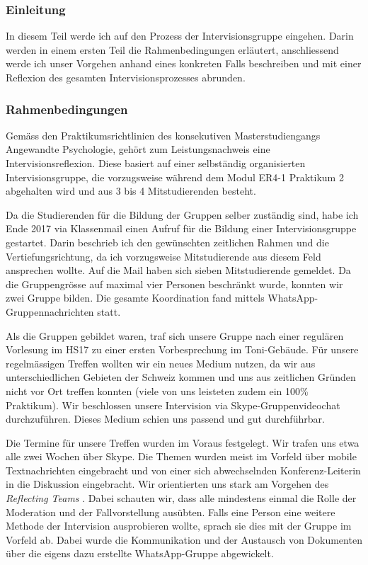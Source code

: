 \subsubsection{Einleitung}
In diesem Teil werde ich auf den Prozess der Intervisionsgruppe  eingehen. Darin werden in einem ersten Teil die Rahmenbedingungen erläutert, anschliessend werde ich unser Vorgehen anhand eines konkreten Falls beschreiben und mit einer Reflexion des gesamten Intervisionsprozesses abrunden. 

\subsubsection{Rahmenbedingungen}
Gemäss den Praktikumsrichtlinien des konsekutiven Masterstudiengangs Angewandte Psychologie, gehört zum Leistungsnachweis eine Intervisionsreflexion. Diese basiert auf einer selbständig organisierten Intervisionsgruppe, die vorzugsweise während dem Modul ER4-1 Praktikum 2 abgehalten wird und aus 3 bis 4 Mitstudierenden besteht.

Da die Studierenden für die Bildung der Gruppen selber zuständig sind, habe ich Ende 2017 via Klassenmail einen Aufruf für die Bildung einer Intervisionsgruppe gestartet. Darin beschrieb ich den gewünschten zeitlichen Rahmen und die Vertiefungsrichtung, da ich vorzugsweise Mitstudierende aus diesem Feld ansprechen wollte. Auf die Mail haben sich sieben Mitstudierende gemeldet. Da die Gruppengrösse auf maximal vier Personen beschränkt wurde, konnten wir zwei Gruppe bilden. Die gesamte Koordination fand 
mittels WhatsApp-Gruppennachrichten statt.

Als die Gruppen gebildet waren, traf sich unsere Gruppe nach einer regulären Vorlesung im HS17 zu einer ersten Vorbesprechung im Toni-Gebäude. Für unsere regelmässigen Treffen wollten wir ein neues Medium nutzen, da wir aus unterschiedlichen Gebieten der Schweiz kommen und uns aus zeitlichen Gründen nicht vor Ort treffen konnten (viele von uns leisteten zudem ein 100\% Praktikum). Wir beschlossen unsere Intervision via Skype-Gruppenvideochat durchzuführen. Dieses Medium schien uns passend und gut durchführbar. 

Die Termine für unsere Treffen wurden im Voraus festgelegt. Wir trafen uns etwa alle zwei Wochen über Skype. Die Themen wurden meist im Vorfeld über mobile Textnachrichten eingebracht und von einer sich abwechselnden Konferenz-Leiterin in die Diskussion eingebracht. Wir orientierten uns stark am Vorgehen des \textit{Reflecting Teams} \cite{ReflectingTeam2018}. Dabei schauten wir, dass alle mindestens einmal die Rolle der Moderation und der Fallvorstellung ausübten. Falls eine Person eine weitere Methode der Intervision ausprobieren wollte, sprach sie dies mit der Gruppe im Vorfeld ab. Dabei wurde die Kommunikation und der Austausch von Dokumenten über die eigens dazu erstellte WhatsApp-Gruppe abgewickelt.

